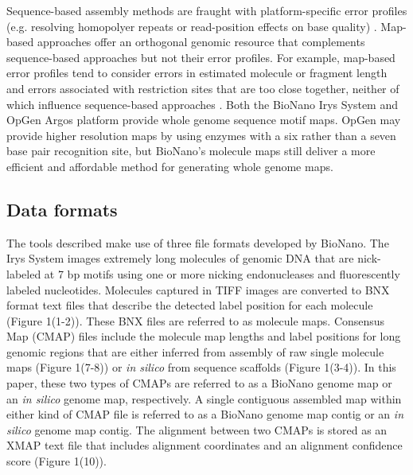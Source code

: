 \documentclass{bmcart}
\begin{document}


Sequence-based assembly methods are fraught with platform-specific error profiles (e.g. resolving homopolyer repeats or read-position effects on base quality) \cite{SeqBias2013}. Map-based approaches offer an orthogonal genomic resource that complements sequence-based approaches but not their error profiles. For example, map-based error profiles tend to consider errors in estimated molecule or fragment length and errors associated with restriction sites that are too close together, neither of which influence sequence-based approaches \cite{OpGenAnalysis2014,BioNanoSV2014}. Both the BioNano Irys System and OpGen Argos platform provide whole genome sequence motif maps. OpGen may provide higher resolution maps by using enzymes with a six rather than a seven base pair recognition site, but BioNano's molecule maps still deliver a more efficient and affordable method for generating whole genome maps. 

\subsection*{Data formats}
The tools described make use of three file formats developed by BioNano. The Irys System images extremely long molecules of genomic DNA that are nick-labeled at 7 bp motifs using one or more nicking endonucleases and fluorescently labeled nucleotides. Molecules captured in TIFF images are converted to BNX format text files that describe the detected label position for each molecule (Figure 1(1-2)). These BNX files are referred to as molecule maps. Consensus Map (CMAP) files include the molecule map lengths and label positions for long genomic regions that are either inferred from assembly of raw single molecule maps (Figure 1(7-8)) or \textit{in silico} from sequence scaffolds (Figure 1(3-4)). In this paper, these two types of CMAPs are referred to as a BioNano genome map or an \textit{in silico} genome map, respectively. A single contiguous assembled map within either kind of CMAP file is referred to as a BioNano genome map contig or an \textit{in silico} genome map contig. The alignment between two CMAPs is stored as an XMAP text file that includes alignment coordinates and an alignment confidence score (Figure 1(10)).
\end{document}
